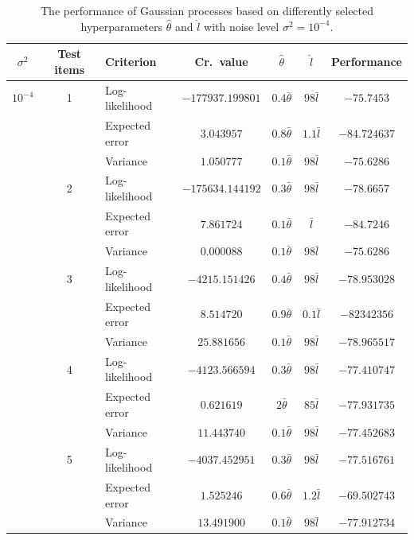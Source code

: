 \documentclass[a4paper,11pt]{article}
\begin{document}
\begin{table}
  \caption{The performance of Gaussian processes based on differently selected hyperparameters $\hat\theta$ and $\hat l$ with noise level $\sigma^2=10^{-4}$.}
  \label{tab:s4}
  \begin{tabular}{cclcccc}
    \hline
    $\sigma^2$ & Test items & Criterion & Cr.\ value & $\hat\theta$ & $\hat l$ & Performance \\
    \hline
    \hline
    $10^{-4}$ & 1 & Log-likelihood & $-177937.199801$ & $0.4\bar\theta$ & $98 \bar l$ & $-75.7453$ \\
              &   & Expected error & $3.043957$ & $0.8\bar\theta$ & $1.1\bar l$ & $-84.724637$ \\
              &   & Variance & $1.050777$ & $0.1\bar\theta$ & $98\bar l$ & $-75.6286$ \\
    \hline
              & 2 & Log-likelihood & $-175634.144192$ & $0.3\bar\theta$ & $98 \bar l$ & $-78.6657$ \\
              &   & Expected error & $7.861724$ & $0.1\bar\theta$ & $\bar l$ & $-84.7246$ \\
              &   & Variance & $0.000088$ & $0.1\bar\theta$ & $98\bar l$ & $-75.6286$ \\
    \hline
              & 3 & Log-likelihood & $-4215.151426$ & $0.4\bar\theta$ & $98 \bar l$ & $-78.953028$ \\
              &   & Expected error & $8.514720$ & $0.9\bar\theta$ & $0.1\bar l$ & $-82342356$ \\
              &   & Variance & $25.881656$ & $0.1\bar\theta$ & $98\bar l$ & $-78.965517$ \\
    \hline
              & 4 & Log-likelihood & $-4123.566594$ & $0.3\bar\theta$ & $98 \bar l$ & $-77.410747$ \\
              &   & Expected error & $0.621619$ & $2\bar\theta$ & $85\bar l$ & $-77.931735$ \\
              &   & Variance & $11.443740$ & $0.1\bar\theta$ & $98\bar l$ & $-77.452683$ \\
    \hline
              & 5 & Log-likelihood & $-4037.452951$ & $0.3\bar\theta$ & $98 \bar l$ & $-77.516761$ \\
              &   & Expected error & $1.525246$ & $0.6\bar\theta$ & $1.2 \bar l$ & $-69.502743$ \\
              &   & Variance & $13.491900$ & $0.1\bar\theta$ & $98\bar l$ & $-77.912734$ \\
    \hline
  \end{tabular}
\end{table}
\end{document}
